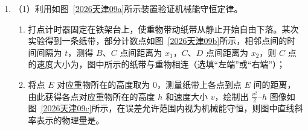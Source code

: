 \documentclass[\gkver]{gaokaozhenti}
\begin{document}
\begin{enumerate}
{D．轴线上从 $O$ 点向无穷远延伸时，场强从 0 开始，先增大到一个最大值，再逐渐减小到 0。如果 $A$ 点位于场强最大值的外侧，从 $A$ 向 $O$ 运动的过程中，场强会先增大、后减小，由 $a = \frac{qE}{m}$ 可知，加速度也会先增大后减小，并非一定逐渐减小，故 D 错误。

故选 AC。
}

\item
（1）利用如图~\ref{2026天津09a}所示装置验证机械能守恒定律。
\begin{enumerate}[label=\protect\Circled{\arabic*}]
	\item
	打点计时器固定在铁架台上，使重物带动纸带从静止开始自由下落。某次实验得到一条纸带，部分计数点如图~\ref{2026天津09b}所示，相邻点间的时间间隔为 $t$，测得 $B$、$C$ 点间距离为 $x_{1}$，$C$、$D$ 点间距离为 $x_{2}$，则 $C$ 点的速度大小为，图中所示的纸带与重物相连（选填“左端”或“右端”）；
	\item
	将点 $E$ 对应重物所在的高度取为 0，测量纸带上各点到点 $E$ 间的距离，由此获得各点对应重物所在的高度 $h$ 和速度大小 $v$，绘制出 $\frac{v^{2}}{2}$--$h$ 图像如图~\ref{2026天津09c}所示，在误差允许范围内视为机械能守恒，则图中直线斜率表示的物理量是。
\end{enumerate}
\threepicture[labelA=2026天津09a, labelB=2026天津09b, labelC=2026天津09c, align=right, hA=5.61cm, wB=9.33cm, hC=2.56cm]{}{}{}


\end{enumerate}
\end{document}
